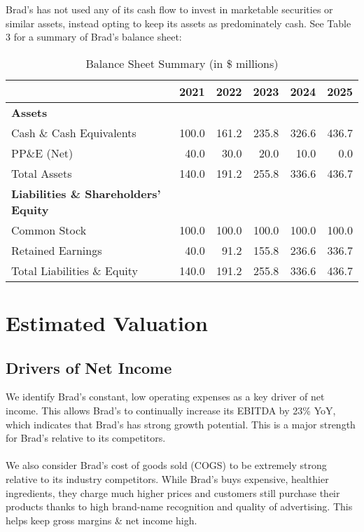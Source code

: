 \documentclass[11pt]{article}
\begin{document}
    Brad's has not used any of its cash flow to invest in marketable securities or similar assets, instead opting to keep its assets as predominately cash. See Table 3 for a summary of Brad's balance sheet:
    \begin{table}[H]
        \centering
        \caption{Balance Sheet Summary (in \$ millions)}
        \begin{tabular}{lrrrrr}
            \toprule
            & 2021 & 2022 & 2023 & 2024 & 2025 \\
            \midrule
            \textbf{Assets} \\
            Cash \& Cash Equivalents     & 100.0 & 161.2 & 235.8 & 326.6 & 436.7 \\
            PP\&E (Net)                  & 40.0 & 30.0 & 20.0 & 10.0 & 0.0 \\
            \addlinespace
            Total Assets                 & 140.0 & 191.2 & 255.8 & 336.6 & 436.7 \\
            \midrule
            \textbf{Liabilities \& Shareholders' Equity} \\
            Common Stock                 & 100.0 & 100.0 & 100.0 & 100.0 & 100.0 \\
            Retained Earnings            & 40.0 & 91.2 & 155.8 & 236.6 & 336.7 \\
            \addlinespace
            Total Liabilities \& Equity & 140.0 & 191.2 & 255.8 & 336.6 & 436.7 \\
            \bottomrule
        \end{tabular}
    \end{table}
\section{Estimated Valuation}
    \subsection{Drivers of Net Income}
    We identify Brad's constant, low operating expenses as a key driver of net income. This allows Brad's to continually increase its EBITDA by 23\% YoY, which indicates that Brad's has strong growth potential. This is a major strength for Brad's relative to its competitors. \\\\
    We also consider Brad's cost of goods sold (COGS) to be extremely strong relative to its industry competitors. While Brad's buys expensive, healthier ingredients, they charge much higher prices and customers still purchase their products thanks to high brand-name recognition and quality of advertising. This helps keep gross margins \& net income high.
\end{document}
